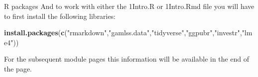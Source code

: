 \documentclass[
  ignorenonframetext,
]{beamer}
\newenvironment{Shaded}{\begin{snugshade}}{\end{snugshade}}
\newcommand{\FunctionTok}[1]{\textcolor[rgb]{0.13,0.29,0.53}{\textbf{#1}}}
\newcommand{\NormalTok}[1]{#1}
\newcommand{\StringTok}[1]{\textcolor[rgb]{0.31,0.60,0.02}{#1}}
\begin{document}
\begin{frame}[fragile]
\begin{block}{R packages}
\label{r-packages}
And to work with either the 1Intro.R or 1Intro.Rmd file you will have to
first install the following libraries:

\begin{Shaded}
\begin{Highlighting}[]
\FunctionTok{install.packages}\NormalTok{(}\FunctionTok{c}\NormalTok{(}\StringTok{"rmarkdown"}\NormalTok{,}\StringTok{"gamlss.data"}\NormalTok{,}\StringTok{"tidyverse"}\NormalTok{,}\StringTok{"ggpubr"}\NormalTok{,}\StringTok{"investr"}\NormalTok{,}\StringTok{"lme4"}\NormalTok{))}
\end{Highlighting}
\end{Shaded}

For the subsequent module pages this information will be available in
the end of the page.
\end{block}
\end{frame}
\end{document}
